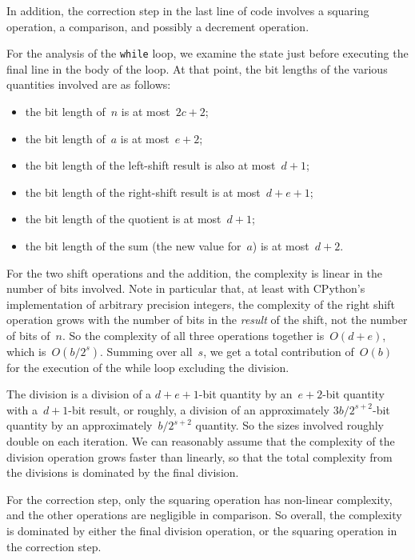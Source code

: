 \documentclass[a4paper]{article}
\theoremstyle{plain}
\theoremstyle{definition}
\begin{document}
In addition, the correction step in the last line of code involves a squaring
operation, a comparison, and possibly a decrement operation.

For the analysis of the \lstinline$while$ loop, we examine the state just
before executing the final line in the body of the loop. At that point, the
bit lengths of the various quantities involved are as follows:

\begin{itemize}
  \item the bit length of~$n$ is at most~$2c + 2$;
  \item the bit length of~$a$ is at most~$e + 2$;
  \item the bit length of the left-shift result is also at most~$d + 1$;
  \item the bit length of the right-shift result is at most~$d + e + 1$;
  \item the bit length of the quotient is at most~$d + 1$;
  \item the bit length of the sum (the new value for~$a$) is at most~$d + 2$.
\end{itemize}

For the two shift operations and the addition, the complexity is linear in the
number of bits involved. Note in particular that, at least with CPython's
implementation of arbitrary precision integers, the complexity of the right
shift operation grows with the number of bits in the \emph{result} of the
shift, not the number of bits of~$n$. So the complexity of all three operations
together is~$O(d+e)$, which is~$O(b/2^s)$. Summing over all~$s$, we get a
total contribution of~$O(b)$ for the execution of the while loop excluding
the division.

The division is a division of a $d + e + 1$-bit quantity by an~$e + 2$-bit
quantity with a~$d + 1$-bit result, or roughly, a division of an approximately
$3b/2^{s+2}$-bit quantity by an approximately~$b/2^{s+2}$ quantity. So
the sizes involved roughly double on each iteration. We can
reasonably assume that the complexity of the division operation grows
faster than linearly, so that the total complexity from the divisions is
dominated by the final division.

For the correction step, only the squaring operation has non-linear complexity,
and the other operations are negligible in comparison. So overall, the
complexity is dominated by either the final division operation, or the
squaring operation in the correction step.
\end{document}
